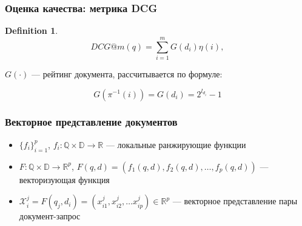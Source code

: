 \documentclass[unicode, notheorems]{beamer}
\newtheorem{definition}{Definition}
\begin{document}
\begin{frame}
\frametitle{Оценка качества: метрика DCG}

\begin{definition}
\begin{equation}
DCG@m(q)=\sum_{i=1}^{m}{G(d_i)\eta(i)},
\end{equation}
\end{definition}
$G(\cdot)$ --- рейтинг документа, рассчитывается по формуле: 

\begin{equation*}
G(\pi^{-1}(i))=G(d_i) = 2^{l_{d_i}} - 1
\end{equation*}

\end{frame}

\begin{frame}
\frametitle{Векторное представление документов}

\begin{itemize}
\item $\{f_i\}_{i=1}^{p}$, $f_i: \mathbb Q \times \mathbb D \rightarrow \mathbb R$ --- локальные ранжирующие функции
\item $F: \mathbb Q \times \mathbb D \rightarrow \mathbb R^p$, $F(q, d) = (f_1(q, d), f_2(q, d), \ldots, f_p(q, d))$ --- векторизующая функция
\item $\mathcal X^j_i = F(q_j, d_i)  = (x^j_{i1}, x^j_{i2}, \ldots x^j_{ip})\in \mathbb R^p$ --- векторное представление пары документ-запрос
\end{itemize}

\end{frame}
\end{document}
